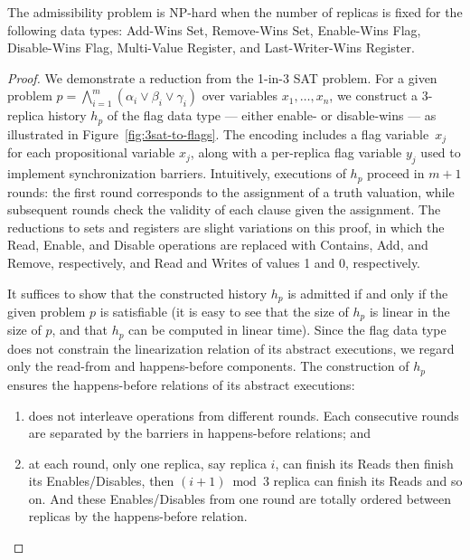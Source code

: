 \vspace{-1mm}
\begin{theorem}
  \label{thm:3sat-to-flags}

  The admissibility problem is NP-hard when the number of replicas is fixed for the following data types: Add-Wins Set, Remove-Wins Set, Enable-Wins Flag, Disable-Wins Flag, Multi-Value Register, and Last-Writer-Wins Register.
\vspace{-1mm}
\end{theorem}

\begin{proof}

  We demonstrate a reduction from the 1-in-3 SAT problem. For a given problem $p = \bigwedge_{i=1}^{m} (\alpha_i \lor \beta_i \lor \gamma_i)$ over variables $x_1, \ldots, x_n$, we construct a 3-replica history $h_p$ of the flag data type — either enable- or disable-wins — as illustrated in Figure~\ref{fig:3sat-to-flags}. The encoding includes a flag variable~$x_j$ for each propositional variable $x_j$, along with a per-replica flag variable $y_j$ used to implement synchronization barriers. Intuitively, executions of $h_p$ proceed in $m+1$ rounds: the first round corresponds to the assignment of a truth valuation, while subsequent rounds check the validity of each clause given the assignment. The reductions to sets and registers are slight variations on this proof, in which the \textrm{Read}, \textrm{Enable}, and \textrm{Disable} operations are replaced with \textrm{Contains}, \textrm{Add}, and \textrm{Remove}, respectively, and \textrm{Read} and \textrm{Writes} of values 1 and 0, respectively. 
  
It suffices to show that the constructed history $h_p$ is admitted if and only if the given problem $p$ is satisfiable (it is easy to see that the size of $h_p$ is linear in the size of $p$, and that $h_p$ can be computed in linear time). Since the flag data type does not constrain the linearization relation of its abstract executions, we regard only the read-from and happens-before components. The construction of $h_p$ ensures the happens-before relations of its abstract executions:
  \vspace{-1.5mm}
  \begin{enumerate}

    \item does not interleave operations from different rounds. Each consecutive rounds are separated by the barriers in happens-before relations; and

    \item at each round, only one replica, say replica $i$, can finish its \textrm{Read}s then finish its \textrm{Enable}s/\textrm{Disable}s, then $(i+1) \bmod 3$ replica can finish its \textrm{Read}s and so on. And these \textrm{Enable}s/\textrm{Disable}s from one round are totally ordered between replicas by the happens-before relation.


\end{enumerate}
\end{proof}
